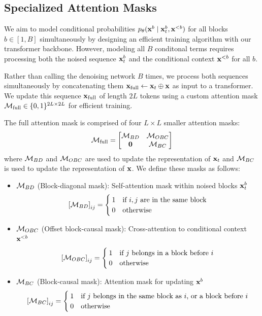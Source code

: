 \documentclass{article} %
\begin{document}
\subsection{Specialized Attention Masks}\label{suppl:masks}
We aim to model conditional probabilities $p_\theta({\mathbf x}^b \mid {\mathbf x}^b_t, {\mathbf x}^{<b})$ for all blocks $b \in [1, B]$ simultaneously by designing an efficient training algorithm with our transformer backbone. However, modeling all $B$ conditonal terms requires processing both the noised sequence ${\mathbf x}_t^b$ and the conditional context ${\mathbf x}^{<b}$ for all $b$.

Rather than calling the denoising network $B$ times, we process both sequences simultaneously by concatenating them ${\mathbf x}_{\text{full}} \gets {\mathbf x}_{t} \oplus {\mathbf x}$ as input to a transformer. We update this sequence ${\mathbf x}_{\text{full}}$ of length $2L$ tokens using a custom attention mask $\mathcal{M}_{\text{full}} \in \{ 0, 1\}^{2L \times 2L}$ for efficient training.

The full attention mask is comprised of four $L \times L$ smaller attention masks:
\begin{equation*}
   \mathcal{M}_{\text{full}} = \begin{bmatrix}
      \mathcal{M}_{BD} & \mathcal{M}_{OBC} \\
      \mathbf{0} & \mathcal{M}_{BC}
   \end{bmatrix}
\end{equation*}
\noindent where $\mathcal{M}_{BD}$ and $\mathcal{M}_{OBC}$ are used to update the representation of ${\mathbf x}_t$ and $\mathcal{M}_{BC}$ is used to update the representation of ${\mathbf x}$. We define these masks as follows:

\begin{itemize}
    \item $\mathcal{M}_{BD}$ (Block-diagonal mask): Self-attention mask within noised blocks ${\mathbf x}_t^b$ $$\left[\mathcal{M}_{BD}\right]_{ij} = \begin{cases} 1 & \text{if $i,j$ are in the same block} \\ 0 & \text{otherwise} \end{cases}$$
    
    \item $\mathcal{M}_{OBC}$ (Offset block-causal mask): Cross-attention to conditional context ${\mathbf x}^{<b}$ $$\left[\mathcal{M}_{OBC}\right]_{ij} = \begin{cases} 1 & \text{if $j$ belongs in a block before $i$}\\ 0 & \text{otherwise} \end{cases}$$
    
    \item $\mathcal{M}_{BC}$ (Block-causal mask): Attention mask for updating ${\mathbf x}^b$
    $$\left[ \mathcal{M}_{BC} \right]_{ij} = \begin{cases} 1 & \text{if $j$ belongs in the same block as $i$, or a block before $i$} \\ 0 & \text{otherwise} \end{cases}$$
\end{itemize}
\end{document}
